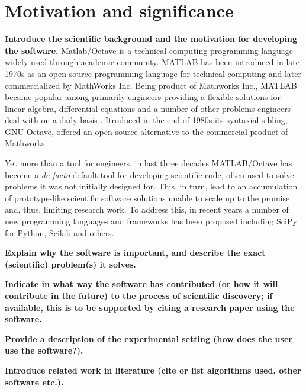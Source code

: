\section{Motivation and significance}
\label{} 

\textbf{Introduce the scientific background and the motivation for developing the software.}
Matlab/Octave is a technical computing programming language widely used through academic community. MATLAB has been introduced in late 1970s as an open source programming language for technical computing and later commercialized by MathWorks Inc. Being product of Mathworks Inc., MATLAB became popular among primarily engineers providing a flexible solutions for linear algebra, differential equations and a number of other problems engineers deal with on a daily basis \cite{moore2014matlab}. Itroduced in the end of 1980s its syntaxial sibling, GNU Octave, offered an open source alternative to the commercial product of Mathworks \cite{eaton1997gnu}.

Yet more than a tool for engineers, in last three decades MATLAB/Octave has become a \textit{de facto} default tool for developing scientific code, often used to solve problems it was not initially designed for. This, in turn, lead to an accumulation of prototype-like scientific software solutions unable to scale up to the promise and, thus, limiting research work. To address this, in recent years a number of new programming languages and frameworks has been proposed including SciPy for Python\cite{jones2001open, Olivier_2002}, Scilab and others. 

\textbf{Explain why the software is important, and describe the exact (scientific) problem(s) it solves.}


\textbf{Indicate in what way the software has contributed (or how it will contribute in the future) to the process of scientific discovery; if available, this is to be supported by citing a research paper using the software.}


\textbf{Provide a description of the experimental setting (how does the user use the software?).}


\textbf{Introduce related work in literature (cite or list algorithms used, other software etc.).}

    
    
    
    
    
    
    
